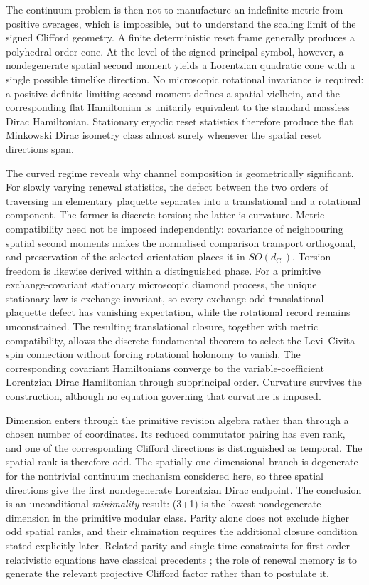 \documentclass[11pt]{article}
\theoremstyle{definition}
\theoremstyle{remark}
\newcommand{\dCl}{d_{\mathrm{Cl}}}
\begin{document}
The continuum problem is then not to manufacture an indefinite metric from
positive averages, which is impossible, but to understand the scaling limit
of the signed Clifford geometry.  A finite deterministic reset frame
generally produces a polyhedral order cone.  At the level of the signed
principal symbol, however, a nondegenerate spatial second moment yields a
Lorentzian quadratic cone with a single possible timelike direction.  No
microscopic rotational invariance is required: a positive-definite limiting
second moment defines a spatial vielbein, and the corresponding flat
Hamiltonian is unitarily equivalent to the standard massless Dirac
Hamiltonian.  Stationary ergodic reset statistics therefore produce the flat
Minkowski Dirac isometry class almost surely whenever the spatial reset
directions span.

The curved regime reveals why channel composition is geometrically
significant.  For slowly varying renewal statistics, the defect between the
two orders of traversing an elementary plaquette separates into a
translational and a rotational component.  The former is discrete torsion;
the latter is curvature.  Metric compatibility need not be imposed
independently: covariance of neighbouring spatial second moments makes the
normalised comparison transport orthogonal, and preservation of the selected
orientation places it in $SO(\dCl)$.  Torsion freedom is likewise derived
within a distinguished phase.  For a primitive exchange-covariant stationary
microscopic diamond process, the unique stationary law is exchange invariant,
so every exchange-odd translational plaquette defect has vanishing expectation,
while the rotational record remains unconstrained.  The resulting
translational closure, together with metric compatibility, allows the discrete
fundamental theorem to select the Levi--Civita spin connection without forcing
rotational holonomy to vanish.  The corresponding covariant Hamiltonians
converge to the variable-coefficient Lorentzian Dirac Hamiltonian through
subprincipal order.  Curvature survives the construction, although no equation
governing that curvature is imposed.

Dimension enters through the primitive revision algebra rather than through
a chosen number of coordinates.  Its reduced commutator pairing has even
rank, and one of the corresponding Clifford directions is distinguished as
temporal.  The spatial rank is therefore odd.  The spatially
one-dimensional branch is degenerate for the nontrivial continuum mechanism
considered here, so three spatial directions give the first nondegenerate
Lorentzian Dirac endpoint.  The conclusion is an unconditional
\emph{minimality} result: (3+1) is the lowest nondegenerate dimension in the
primitive modular class.  Parity alone does not exclude higher odd spatial
ranks, and their elimination requires the additional closure condition
stated explicitly later.  Related parity and single-time constraints for
first-order relativistic equations have classical precedents
\cite{mankocborstniknielsen2000,vandamng2001,nielsenrugh1994};
the role of renewal memory is to generate the relevant projective Clifford
factor rather than to postulate it.
\end{document}
